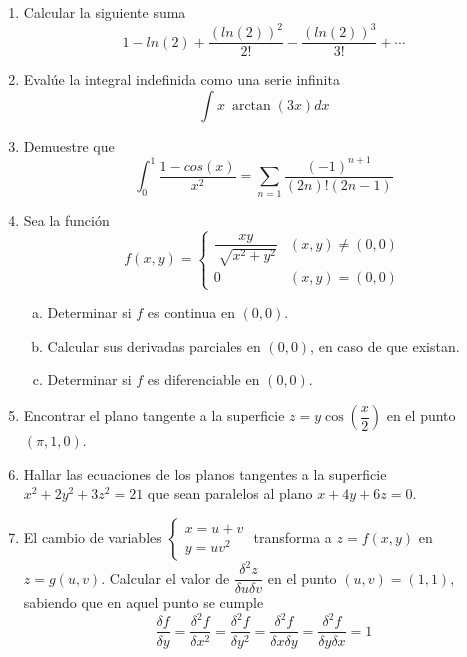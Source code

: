 \documentclass[12pt]{article}
\newenvironment{preguntas}
{\begin{enumerate}\itemsep12pt
	}
	{
	\end{enumerate}
}
\begin{document}
\begin{preguntas}
\item Calcular la siguiente suma
	$$1 - ln(2) + \dfrac{(ln(2))^2}{2!}-\dfrac{(ln(2))^3}{3!}+\cdots$$
\item Evalúe la integral indefinida como una serie infinita
	$$\int x\ \arctan(3x)dx$$
\item Demuestre que
$$\int_0^1 \dfrac{1-cos(x)}{x^2} = \sum\limits_{n=1} \dfrac{(-1)^{n+1}}{(2n)!(2n-1)} $$
\item Sea la función
	$$f(x,y)=
	\begin{cases}
	\dfrac{xy}{\sqrt[]{x^2+y^2}} & (x,y) \neq (0,0)\\
	0 & (x,y)=(0,0)
	\end{cases}
	$$
\begin{enumerate}[a)]
\item Determinar si $f$ es continua en $(0,0)$.
\item Calcular sus derivadas parciales en $(0,0)$, en caso de que existan.
\item Determinar si $f$ es diferenciable en $(0,0)$.
\end{enumerate}
\item Encontrar el plano tangente a la superficie $z = y\cos\left(\dfrac{x}{2}\right)$ en el punto $(\pi, 1, 0)$.
\item Hallar las ecuaciones de los planos tangentes a la superficie $x^2 + 2y^2 + 3z^2 = 21$ que sean paralelos al plano $x + 4y + 6z = 0$.
\item El cambio de variables 
	$\begin{cases}
	x=u+v\\
	y=uv^2
	\end{cases}$
	transforma a $z=f(x,y)$ en $z=g(u,v)$. Calcular el valor de $\dfrac{\delta^2z}{\delta u \delta v}$ en el punto $(u,v) = (1,1)$, sabiendo que en aquel punto se cumple$$\dfrac{\delta f}			{\delta y} = \dfrac{\delta^2 f}{\delta x^2}=\dfrac{\delta^2 f}{\delta y^2}=\dfrac{\delta^2 f}{\delta x \delta y}=\dfrac{\delta^2 f}{\delta y \delta x}=1$$
\end{preguntas}
\end{document}
